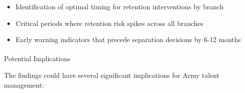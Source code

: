 \documentclass[
  letterpaper,
  DIV=11,
  numbers=noendperiod]{scrartcl}
\makeatletter
\let\oldparagraph\paragraph
\renewcommand{\paragraph}{
    \@ifstar
      \xxxParagraphStar
      \xxxParagraphNoStar
  }
\newcommand{\xxxParagraphStar}[1]{\oldparagraph*{#1}\mbox{}}
\newcommand{\xxxParagraphNoStar}[1]{\oldparagraph{#1}\mbox{}}
\providecommand{\tightlist}{%
  \setlength{\itemsep}{0pt}\setlength{\parskip}{0pt}}
\makeatother
\begin{document}
\begin{enumerate}
  \begin{itemize}
  \tightlist
  \item
    Identification of optimal timing for retention interventions by
    branch
  \item
    Critical periods where retention risk spikes across all branches
  \item
    Early warning indicators that precede separation decisions by 6-12
    months
  \end{itemize}
\end{enumerate}

\paragraph{Potential Implications}\label{potential-implications}

The findings could have several significant implications for Army talent
management:
\end{document}
